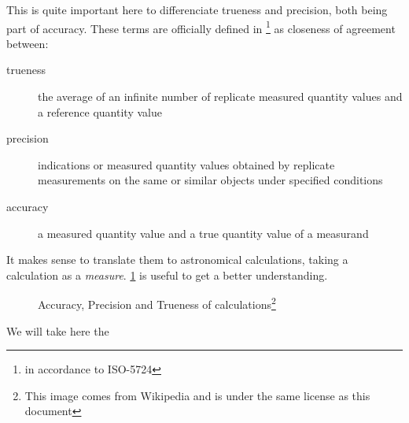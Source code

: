 

This is quite important here to differenciate trueness and precision, both being part of accuracy. These terms are officially defined in \cite{VIM}\footnote{in accordance to ISO-5724\cite{ISO5725}} as closeness of agreement between:

\begin{description}
\item[trueness] the average of an infinite number of replicate measured quantity values and a reference quantity value
\item[precision] indications or measured quantity values obtained by replicate measurements on the same or similar objects under specified conditions
\item[accuracy] a measured quantity value and a true quantity value of a measurand
\end{description}

It makes sense to translate them to astronomical calculations, taking a calculation as a \emph{measure}. \ref{ATP} is useful to get a better understanding.

\begin{figure}[h]
\centering
\def\svgwidth{10cm}

\label{ATP}
\caption{Accuracy, Precision and Trueness of calculations\footnote{This image comes from Wikipedia and is under the same license as this document}}
\end{figure}


We will take here the 



